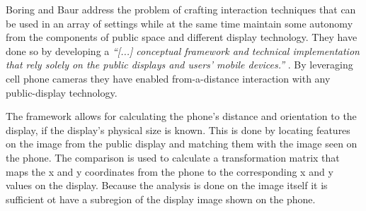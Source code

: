 Boring and Baur address the problem of crafting interaction techniques that can be used in an array of settings while at the same time maintain some autonomy from the components of public space and different display technology. %
They have done so by developing a \emph{``[...] conceptual framework and technical implementation that rely solely on the public displays and users' mobile devices.''} \cite{Boring:2013}. By  leveraging cell phone cameras they have enabled from-a-distance interaction with any public-display technology.
%

The framework allows for calculating the phone's distance and orientation to the display, if the display's physical size is known.
This is done by locating features on the image from the public display and matching them with the image seen on the phone. The comparison is used to calculate a transformation matrix that maps the x and y coordinates from the phone to the corresponding x and y values on the display. Because the analysis is done on the image itself  it is sufficient ot have a subregion of the display image shown on the phone.

